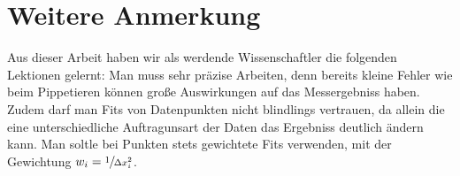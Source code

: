 \section{Weitere Anmerkung}
Aus dieser Arbeit haben wir als werdende Wissenschaftler die folgenden Lektionen gelernt:\newline
Man muss sehr präzise Arbeiten, denn bereits kleine Fehler wie beim Pippetieren können große Auswirkungen auf
das Messergebniss haben.
Zudem darf man Fits von Datenpunkten nicht blindlings vertrauen, da allein die eine unterschiedliche
Auftragunsart der Daten das Ergebniss deutlich ändern kann. Man soltle bei Punkten stets gewichtete Fits verwenden,
mit der Gewichtung $ w_i = \sfrac{1}{\Delta x_i^2}$.


